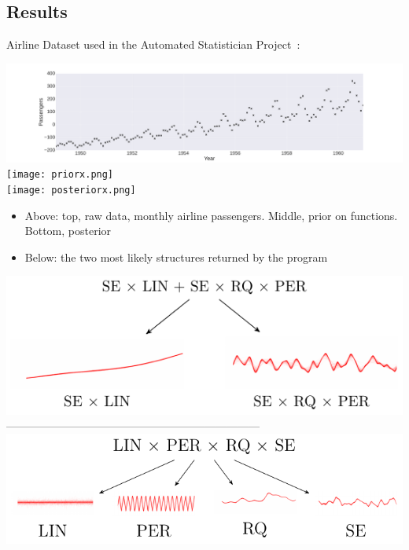 \documentclass[a0,portrait]{a0poster}
\begin{document}
\begin{multicols}{3}
\begin{minipage}{\linewidth}
\end{minipage}



 
 \subsection*{Results}
Airline Dataset used in the Automated Statistician Project~\cite{duvenaud2013structure}:
\begin{center}
\includegraphics[width=\linewidth]{rawx.png}\\
\texttt{[image: priorx.png]}\\
\texttt{[image: posteriorx.png]}
\end{center}
\begin{itemize}
\item Above: top, raw data, monthly airline passengers. Middle, prior on functions. Bottom, posterior
\item Below: the two most likely structures returned by the program
\end{itemize}

 \begin{center}

\end{center}
\begin{center}
\includegraphics[width=0.75\linewidth]{airline_struct_1.pdf}
---------------------------------------------------------------------
\includegraphics[width=0.7\linewidth]{airline_struct_2.pdf} 
 \end{center}
 

\end{multicols}
\end{document}
